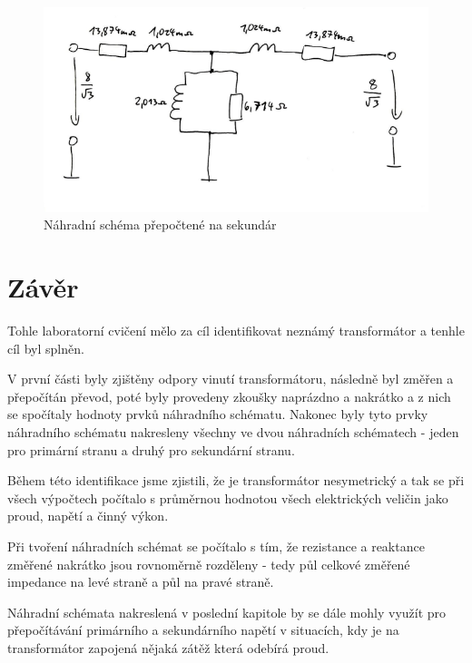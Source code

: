 \documentclass{protokol}
\begin{document}
\begin{figure}[H]
    \centering
    \includegraphics[width=1\linewidth]{PrepoctenoNaSekundar.png}
    \caption{Náhradní schéma přepočtené na sekundár}
    \label{fig:NahradniSchemaSekundar}
\end{figure}
\section{Závěr}
Tohle laboratorní cvičení mělo za cíl identifikovat neznámý transformátor a tenhle cíl byl splněn.

V první části byly zjištěny odpory vinutí transformátoru, následně byl změřen a přepočítán převod, poté byly provedeny zkoušky naprázdno a nakrátko a z nich se spočítaly hodnoty prvků náhradního schématu. Nakonec byly tyto prvky náhradního schématu nakresleny všechny ve dvou náhradních schématech - jeden pro primární stranu a druhý pro sekundární stranu.

Během této identifikace jsme zjistili, že je transformátor nesymetrický a tak se při všech výpočtech počítalo s průměrnou hodnotou všech elektrických veličin jako proud, napětí a činný výkon.

Při tvoření náhradních schémat se počítalo s tím, že rezistance a reaktance změřené nakrátko jsou rovnoměrně rozděleny - tedy půl celkové změřené impedance na levé straně a půl na pravé straně.

Náhradní schémata nakreslená v poslední kapitole by se dále mohly využít pro přepočítávání primárního a sekundárního napětí v situacích, kdy je na transformátor zapojená nějaká zátěž která odebírá proud.
\end{document}
